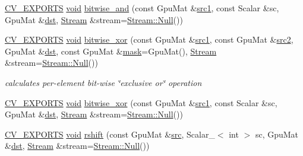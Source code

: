\begin{DoxyCompactItemize}
\hyperlink{core_2types__c_8h_a1bf9f0e121b54272da02379cfccd0a2b}{C\-V\-\_\-\-E\-X\-P\-O\-R\-T\-S} \hyperlink{legacy_8hpp_a8bb47f092d473522721002c86c13b94e}{void} \hyperlink{namespacecv_1_1gpu_ab14250e61ab69453665235af83cae4f7}{bitwise\-\_\-and} (const Gpu\-Mat \&\hyperlink{core__c_8h_a897de4702c922f4cccda0d57ccdcafb3}{src1}, const Scalar \&sc, Gpu\-Mat \&\hyperlink{photo__c_8h_aed13e2a25279b24dc954073233fef7a5}{dst}, \hyperlink{classcv_1_1gpu_1_1Stream}{Stream} \&stream=\hyperlink{classcv_1_1gpu_1_1Stream_af96c23564834f88333dcb8997df553f1}{Stream\-::\-Null}())
\item 
\hyperlink{core_2types__c_8h_a1bf9f0e121b54272da02379cfccd0a2b}{C\-V\-\_\-\-E\-X\-P\-O\-R\-T\-S} \hyperlink{legacy_8hpp_a8bb47f092d473522721002c86c13b94e}{void} \hyperlink{namespacecv_1_1gpu_a769b2863b6c2c95d671e9c85a9f05757}{bitwise\-\_\-xor} (const Gpu\-Mat \&\hyperlink{core__c_8h_a897de4702c922f4cccda0d57ccdcafb3}{src1}, const Gpu\-Mat \&\hyperlink{core__c_8h_a7561a36d48069d54a6c8ac4e4750edfd}{src2}, Gpu\-Mat \&\hyperlink{photo__c_8h_aed13e2a25279b24dc954073233fef7a5}{dst}, const Gpu\-Mat \&\hyperlink{tracking_8hpp_a6b13ecd2fd6ec7ad422f1d7863c3ad19}{mask}=Gpu\-Mat(), \hyperlink{classcv_1_1gpu_1_1Stream}{Stream} \&stream=\hyperlink{classcv_1_1gpu_1_1Stream_af96c23564834f88333dcb8997df553f1}{Stream\-::\-Null}())
\begin{DoxyCompactList}\small\item\em calculates per-\/element bit-\/wise \char`\"{}exclusive or\char`\"{} operation \end{DoxyCompactList}\item 
\hyperlink{core_2types__c_8h_a1bf9f0e121b54272da02379cfccd0a2b}{C\-V\-\_\-\-E\-X\-P\-O\-R\-T\-S} \hyperlink{legacy_8hpp_a8bb47f092d473522721002c86c13b94e}{void} \hyperlink{namespacecv_1_1gpu_af35d93ce9eff19b712f0d4bbbf0493cb}{bitwise\-\_\-xor} (const Gpu\-Mat \&\hyperlink{core__c_8h_a897de4702c922f4cccda0d57ccdcafb3}{src1}, const Scalar \&sc, Gpu\-Mat \&\hyperlink{photo__c_8h_aed13e2a25279b24dc954073233fef7a5}{dst}, \hyperlink{classcv_1_1gpu_1_1Stream}{Stream} \&stream=\hyperlink{classcv_1_1gpu_1_1Stream_af96c23564834f88333dcb8997df553f1}{Stream\-::\-Null}())
\item 
\hyperlink{core_2types__c_8h_a1bf9f0e121b54272da02379cfccd0a2b}{C\-V\-\_\-\-E\-X\-P\-O\-R\-T\-S} \hyperlink{legacy_8hpp_a8bb47f092d473522721002c86c13b94e}{void} \hyperlink{namespacecv_1_1gpu_ad37b179aebc3beb5eef36fc7d181c97c}{rshift} (const Gpu\-Mat \&\hyperlink{legacy_8hpp_a371cd109b74033bc4366f584edd3dacc}{src}, Scalar\-\_\-$<$ int $>$ sc, Gpu\-Mat \&\hyperlink{photo__c_8h_aed13e2a25279b24dc954073233fef7a5}{dst}, \hyperlink{classcv_1_1gpu_1_1Stream}{Stream} \&stream=\hyperlink{classcv_1_1gpu_1_1Stream_af96c23564834f88333dcb8997df553f1}{Stream\-::\-Null}())

\end{DoxyCompactItemize}
